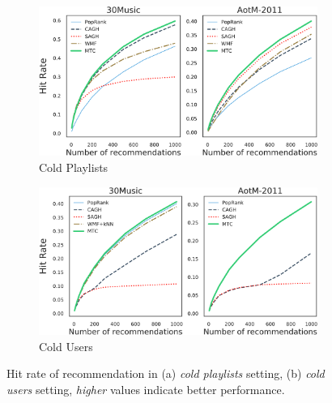 \begin{figure}[!h]
    \begin{subfigure}[t]{.46\textwidth}
        \centering
        \includegraphics[width=\textwidth]{fig/hr3.pdf}
        \caption{Cold Playlists}
        \label{fig:hr3}
    \end{subfigure}\hspace{15pt}
    \begin{subfigure}[t]{.46\textwidth}
        \centering
        \includegraphics[width=\textwidth]{fig/hr4.pdf}
        \caption{Cold Users}
        \label{fig:hr4}
    \end{subfigure}
    \caption{Hit rate of recommendation in (a) \emph{cold playlists} setting, (b) \emph{cold users} setting, 
\emph{higher} values indicate better performance.}
\end{figure}
